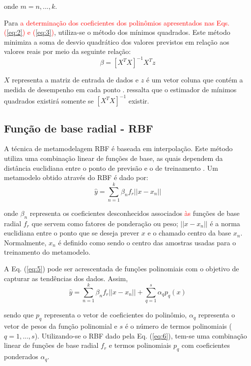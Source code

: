 \noindent onde $m=n,...,k$.

Para \textcolor{red}{a determinação dos coeficientes dos polinômios apresentados nas Eqs. (\ref{eq:2}) e (\ref{eq:3})}, utiliza-se o método dos mínimos quadrados. Este método minimiza a soma de desvio quadrático dos valores previstos em relação aos valores reais por meio da seguinte relação:
\begin{equation}
\beta= [{X^T}X]^{-1}{X}^Tz
\label{eq:4}
\end{equation}

\noindent $X$ representa a matriz de entrada de dados e $z$ é um vetor coluna que contém a medida de desempenho em cada ponto \cite{myers2016}.  ressalta que o estimador de mínimos quadrados existirá somente se $ {[{X^T}X]}^{-1}$ existir. 

\subsection{Função de base radial - RBF}

A técnica de metamodelagem RBF é baseada em interpolação. Este método utiliza uma combinação linear de funções de base, as quais dependem da distância euclidiana entre o ponto de previsão e o de treinamento \cite{BOUHLEL2019,sun2017,PINA2010}. Um metamodelo obtido através do RBF é dado por: 
\begin{equation}
\hat{y}=\sum_{n=1}^{k}{\beta_n}f_r{||x-{x_n}||}
\label{eq:5}
\end{equation}

\noindent onde ${\beta_n}$ representa os coeficientes desconhecidos associados \textcolor{red}{às} funções de base radial $f_r$ que servem como fatores de ponderação ou peso; $ ||x -{x}_n||$ é a norma euclidiana entre o ponto que se deseja prever $x$ e o chamado centro da base ${x}_n$. Normalmente, ${x}_n$ é definido como sendo o centro das amostras usadas para o treinamento do metamodelo.

A Eq. (\ref{eq:5}) pode ser acrescentada de funções polinomiais com o objetivo de capturar as tendências dos dados. Assim, 
\begin{equation}
\hat{y}=\sum_{n=1}^{k}{\beta_n}f_r{||x-{x_n}||}+\sum_{q=1}^{s}{\alpha_q}p_q(x)
\label{eq:6}
\end{equation}

\noindent sendo que ${p}_q$ representa o vetor de coeficientes do polinômio, ${\alpha}_q$ representa o vetor de pesos da função polinomial e $s$ é o número de termos polinomiais ($q=1,...,s$). Utilizando-se o RBF dado pela Eq. (\ref{eq:6}), tem-se uma combinação linear de funções de base radial $f_r$ e termos polinomiais ${p}_q$ com coeficientes ponderados ${\alpha}_q$.


